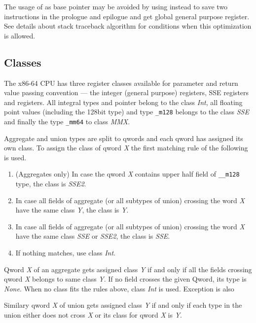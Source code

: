 The usage of \RBP{} as base pointer may be avoided by using \RSP{} instead
to save two instructions in the prologue and epilogue and get global general
purpose register.  See details about stack traceback algorithm for conditions
when this optimization is allowed.

\subsection{Classes}

The x86-64 CPU has three register classes available for parameter and
return value passing convention --- the integer (general purpose)
registers, SSE registers and \MMX registers.  All integral types and
pointer belong to the class \emph{Int}, all floating point values
(including the 128bit type) and type \verb|_m128| belongs to the class
\emph{SSE} and finally the type \verb|_mm64| to class \emph{MMX}.

Aggregate and union types are split to qwords and each qword has
assigned its own class. To assign the class of qword \emph{X} the
first matching rule of the following is used.
\begin{enumerate}
\item (Aggregates only) In case the qword \emph{X} contains upper half field of
\verb|__m128| type, the class is \emph{SSE2}.

\item In case all fields of aggregate (or all subtypes of union) crossing the
word \emph{X} have the same class \emph{Y}, the class is \emph{Y}.

\item In case all fields of aggregate (or all subtypes of union) crossing the
word \emph{X} have the same class \emph{SSE} or \emph{SSE2}, the class
is \emph{SSE}.

\item If nothing matches, use class \emph{Int}.
\end{enumerate}

Qword \emph{X} of an aggregate gets assigned class \emph{Y} if and only
if all the fields crossing qword \emph{X} belongs to same class \emph{Y}.  If
no field crosses the given Qword, its type is \emph{None}. When no class fits
the rules above, class \emph{Int} is used.  Exception is also 

Similary qword \emph{X} of union gets assigned class \emph{Y} if and only if
each type in the union either does not cross \emph{X} or its class for qword
\emph{X} is \emph{Y}.

